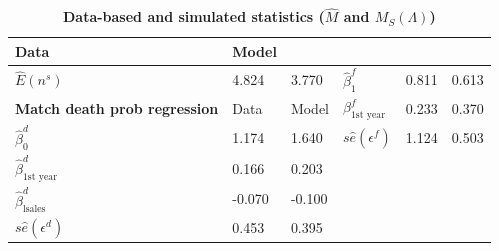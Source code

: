 \begin{table}
{\begin{tabular}{llllll}
        {Data}                                                                        & {Model} \\ \hline
        $\widehat{E}\left( n^{s}\right) $                                             & {4.824}                                        &
        {3.770}                                                                       & $\widehat{\beta }_{1}^{f}$                     & {
        0.811}                                                                        & {0.613} \\
        \textbf{Match death prob regression}                                          & {Data}                                         &
        {Model}                                                                       & $\beta _{\mbox{1st
        year}}^{f}$                                                                   & {0.233}                                        & {0.370} \\
        \cline{1-3}
        $\widehat{\beta }_{0}^{d}$                                                    & {1.174}                                        & {
        1.640}                                                                        & $s\widehat{e}(\epsilon ^{f})$                  & {1.124}       &
        {0.503} \\
        $\widehat{\beta }_{\mbox{1st year}}^{d}$                                      & {0.166}                                        &
        {0.203}                                                                       &                                                &               & \\
        $\widehat{\beta }_{\mbox{lsales}}^{d}$                                        & {-0.070}                                       &
        {-0.100}                                                                      &                                                &               & \\
        $s\widehat{e}(\epsilon ^{d})$                                                 & {0.453}                                        &
        {0.395}                                                                       &                                                &               & \\ \hline
        \end{tabular}%
    }
\caption{\textbf{Data-based and simulated statistics ($\widehat{M}$ and $M_{S}(\Lambda)$)}}
\label{tab:est_results}
\end{table}
\pagebreak

